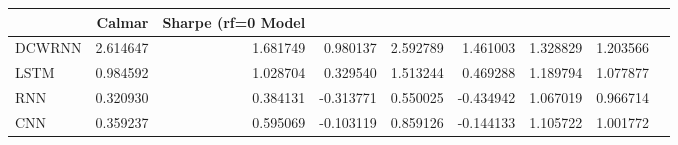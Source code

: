 \begin{tabular}{lrrrrrrr}
\toprule
 & Calmar & Sharpe (rf=0%
Model &  &  &  &  &  &  &  \\
\midrule
DCWRNN & 2.614647 & 1.681749 & 0.980137 & 2.592789 & 1.461003 & 1.328829 & 1.203566 \\
LSTM & 0.984592 & 1.028704 & 0.329540 & 1.513244 & 0.469288 & 1.189794 & 1.077877 \\
RNN & 0.320930 & 0.384131 & -0.313771 & 0.550025 & -0.434942 & 1.067019 & 0.966714 \\
CNN & 0.359237 & 0.595069 & -0.103119 & 0.859126 & -0.144133 & 1.105722 & 1.001772 \\
\bottomrule
\end{tabular}
